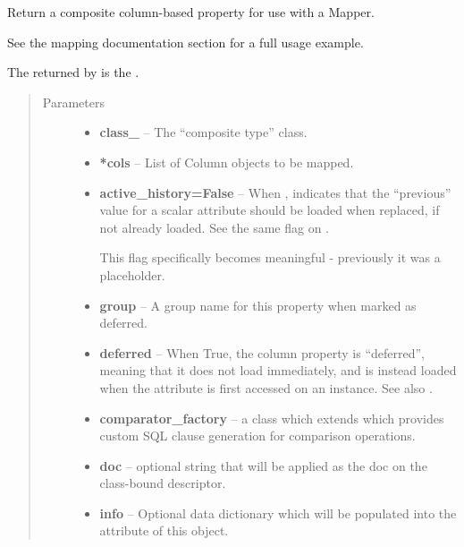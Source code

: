 \documentclass[letterpaper,10pt,english]{sphinxmanual}
\begin{document}
\begin{fulllineitems}
\label{api/piecash.model_business:piecash.model_business.composite}
Return a composite column-based property for use with a Mapper.

See the mapping documentation section  for a
full usage example.

The  returned by {\hyperref[api/piecash.model_business:piecash.model_business.composite]{}}
is the .
\begin{quote}\begin{description}
\item[{Parameters}] \leavevmode\begin{itemize}
\item {} 
\textbf{class\_} -- The ``composite type'' class.

\item {} 
\textbf{*cols} -- List of Column objects to be mapped.

\item {} 
\textbf{active\_history=False} -- 
When , indicates that the ``previous'' value for a
scalar attribute should be loaded when replaced, if not
already loaded.  See the same flag on .

This flag specifically becomes meaningful
- previously it was a placeholder.


\item {} 
\textbf{group} -- A group name for this property when marked as deferred.

\item {} 
\textbf{deferred} -- When True, the column property is ``deferred'', meaning that it does
not load immediately, and is instead loaded when the attribute is
first accessed on an instance.  See also
.

\item {} 
\textbf{comparator\_factory} -- a class which extends
 which provides custom SQL
clause generation for comparison operations.

\item {} 
\textbf{doc} -- optional string that will be applied as the doc on the
class-bound descriptor.

\item {} 
\textbf{info} -- 
Optional data dictionary which will be populated into the
 attribute of this object.


\end{itemize}
\end{description}
\end{quote}
\end{fulllineitems}
\end{document}
